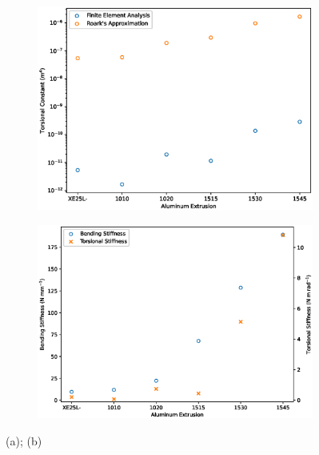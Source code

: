 \begin{figure}
    \centering
    \begin{subfigure}{0.49\textwidth}
        \centering
        \includegraphics[trim={1cm 0 0 0}, clip, width=\textwidth]{../figures/torsional_constant.eps}
        \caption{}
        \label{fig:structural_torsional_constant}
    \end{subfigure}
    \begin{subfigure}{0.49\textwidth}
        \centering
        \includegraphics[trim={0 0 0.5cm 0}, clip, width=\textwidth]{../figures/stiffness.eps}
        \caption{}
        \label{fig:structural_stiffness}
    \end{subfigure}
    \caption{(a); (b)}
    \label{fig:structural_intermediate_results}
\end{figure}


